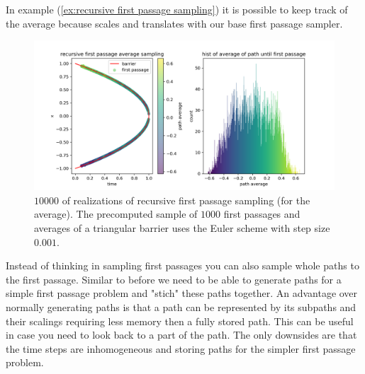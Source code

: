 \documentclass[a4paper,12pt]{article}
\begin{document}
\begin{example}
    In example (\ref{ex:recursive first passage sampling}) it is possible to keep
    track of the average because scales and translates with our base first passage sampler.

    \begin{figure}[ht!]
        \centering
        \includegraphics[width=1\textwidth]{plots/recursive first passage average para.png}
        \caption{ $10000$ of realizations of recursive first passage sampling (for the average).
            The precomputed sample of $1000$ first passages and averages of a triangular barrier
            uses the Euler scheme with step size $0.001$.}
        \label{fig:recursive first passage average para}
    \end{figure}
\end{example}


\begin{technique}
    Instead of thinking in sampling first passages  you can also sample
    whole paths to the first passage. Similar to before we need to be
    able to generate paths for a simple first passage problem and "stich"
    these paths together. An advantage over normally generating paths
    is that a path can be represented by its subpaths and their scalings
    requiring less memory then a fully stored path. This can be useful
    in case you need to look back to a part of the path.
    The only downsides are that the time steps are inhomogeneous
    and storing paths for the simpler first passage problem.
\end{technique}
\end{document}
